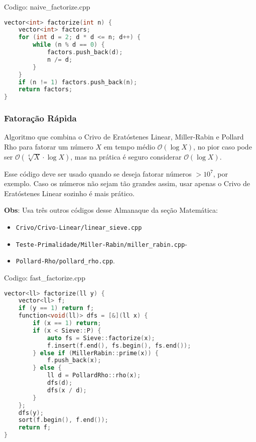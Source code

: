 \documentclass[10pt, a4paper, oneside]{book}
\begin{document}
Codigo: naive\_factorize.cpp

\begin{lstlisting}[language=C++]
vector<int> factorize(int n) {
    vector<int> factors;
    for (int d = 2; d * d <= n; d++) {
        while (n % d == 0) {
            factors.push_back(d);
            n /= d;
        }
    }
    if (n != 1) factors.push_back(n);
    return factors;
}
\end{lstlisting}
\hfill

\subsubsection{Fatoração Rápida}


Algoritmo que combina o Crivo de Eratóstenes Linear, Miller-Rabin e Pollard Rho para fatorar um número $X$ em tempo médio $\mathcal{O}(\log X)$, no pior caso pode ser $\mathcal{O}(\sqrt[4]{X} \cdot \log X)$, mas na prática é seguro considerar $\mathcal{O}(\log X)$.



Esse código deve ser usado quando se deseja fatorar números $> 10^7$, por exemplo. Caso os números não sejam tão grandes assim, usar apenas o Crivo de Eratóstenes Linear sozinho é mais prático.



\textbf{Obs}: Usa três outros códigos desse Almanaque da seção Matemática:

\begin{itemize}
\item \texttt{Crivo/Crivo-Linear/linear\_sieve.cpp}
\item \texttt{Teste-Primalidade/Miller-Rabin/miller\_rabin.cpp}-
\item \texttt{Pollard-Rho/pollard\_rho.cpp}.
\end{itemize}

\hfill

Codigo: fast\_factorize.cpp

\begin{lstlisting}[language=C++]
vector<ll> factorize(ll y) {
    vector<ll> f;
    if (y == 1) return f;
    function<void(ll)> dfs = [&](ll x) {
        if (x == 1) return;
        if (x < Sieve::P) {
            auto fs = Sieve::factorize(x);
            f.insert(f.end(), fs.begin(), fs.end());
        } else if (MillerRabin::prime(x)) {
            f.push_back(x);
        } else {
            ll d = PollardRho::rho(x);
            dfs(d);
            dfs(x / d);
        }
    };
    dfs(y);
    sort(f.begin(), f.end());
    return f;
}\end{lstlisting}
\hfill
\end{document}

